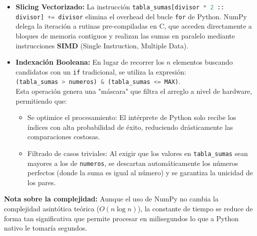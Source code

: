 \begin{itemize}
	\item \textbf{Slicing Vectorizado:} La instrucción \colorbox{gray!10}{\lstinline[language=Python]|tabla_sumas[divisor * 2 :: divisor] += divisor|} elimina el overhead del bucle \texttt{for} de Python. NumPy delega la iteración a rutinas pre-compiladas en C, que acceden directamente a bloques de memoria contiguos y realizan las sumas en paralelo mediante instrucciones \textbf{SIMD} (Single Instruction, Multiple Data).

	\item \textbf{Indexación Booleana:} En lugar de recorrer los $n$ elementos buscando candidatos con un \texttt{if} tradicional, se utiliza la expresión: \\
	      \colorbox{gray!10}{\lstinline[language=Python]|(tabla_sumas > numeros) & (tabla_sumas <= MAX)|}.\\
	      Esta operación genera una "máscara" que filtra el arreglo a nivel de hardware, permitiendo que:
	      \begin{itemize}
		      \item Se optimice el procesamiento: El intérprete de Python solo recibe los índices con alta probabilidad de éxito, reduciendo drásticamente las comparaciones costosas.
		      \item Filtrado de casos triviales: Al exigir que los valores en \texttt{tabla\_sumas} sean mayores a los de \texttt{numeros}, se descartan automáticamente los números perfectos (donde la suma es igual al número) y se garantiza la unicidad de los pares.
          \end{itemize}
\end{itemize}

\textbf{Nota sobre la complejidad:} Aunque el uso de NumPy no cambia la complejidad asintótica teórica ($O(n \log n)$), la constante de tiempo se reduce de forma tan significativa que permite procesar en milisegundos lo que a Python nativo le tomaría segundos.
